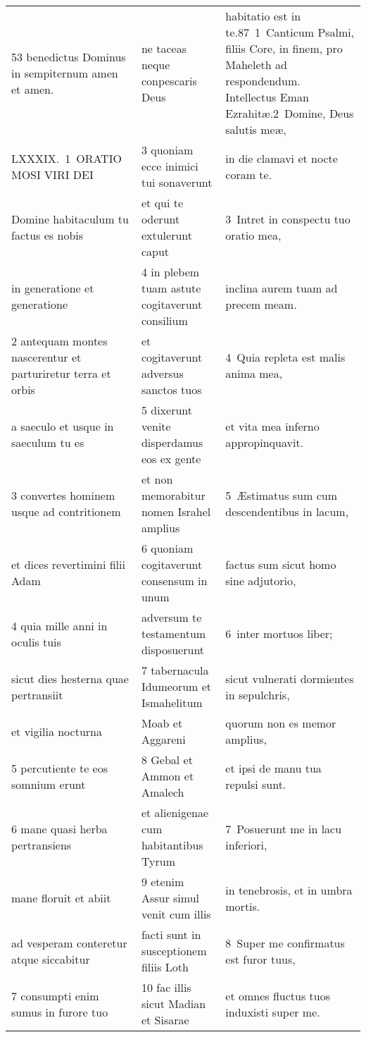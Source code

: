 \documentclass{article}
\begin{document}
\begin{longtable}{@{}p{}p{}p{}@{}}
53 benedictus Dominus in sempiternum amen et amen.	&	ne taceas neque conpescaris Deus	&	habitatio est in te.87 1 Canticum Psalmi, filiis Core, in finem, pro Maheleth ad respondendum. Intellectus Eman Ezrahitæ.2 Domine, Deus salutis meæ,	\\
LXXXIX. 1 ORATIO MOSI VIRI DEI	&	3 quoniam ecce inimici tui sonaverunt	&	in die clamavi et nocte coram te.	\\
Domine habitaculum tu factus es nobis	&	et qui te oderunt extulerunt caput	&	3 Intret in conspectu tuo oratio mea,	\\
in generatione et generatione	&	4 in plebem tuam astute cogitaverunt consilium	&	inclina aurem tuam ad precem meam.	\\
2 antequam montes nascerentur et parturiretur terra et orbis	&	et cogitaverunt adversus sanctos tuos	&	4 Quia repleta est malis anima mea,	\\
a saeculo et usque in saeculum tu es	&	5 dixerunt venite disperdamus eos ex gente	&	et vita mea inferno appropinquavit.	\\
3 convertes hominem usque ad contritionem	&	et non memorabitur nomen Israhel amplius	&	5 Æstimatus sum cum descendentibus in lacum,	\\
et dices revertimini filii Adam	&	6 quoniam cogitaverunt consensum in unum	&	factus sum sicut homo sine adjutorio,	\\
4 quia mille anni in oculis tuis	&	adversum te testamentum disposuerunt	&	6 inter mortuos liber;	\\
sicut dies hesterna quae pertransiit	&	7 tabernacula Idumeorum et Ismahelitum	&	sicut vulnerati dormientes in sepulchris,	\\
et vigilia nocturna	&	Moab et Aggareni	&	quorum non es memor amplius,	\\
5 percutiente te eos somnium erunt	&	8 Gebal et Ammon et Amalech	&	et ipsi de manu tua repulsi sunt.	\\
6 mane quasi herba pertransiens	&	et alienigenae cum habitantibus Tyrum	&	7 Posuerunt me in lacu inferiori,	\\
mane floruit et abiit	&	9 etenim Assur simul venit cum illis	&	in tenebrosis, et in umbra mortis.	\\
ad vesperam conteretur atque siccabitur	&	facti sunt in susceptionem filiis Loth	&	8 Super me confirmatus est furor tuus,	\\
7 consumpti enim sumus in furore tuo	&	10 fac illis sicut Madian et Sisarae	&	et omnes fluctus tuos induxisti super me.	\\

\end{longtable}
\end{document}
